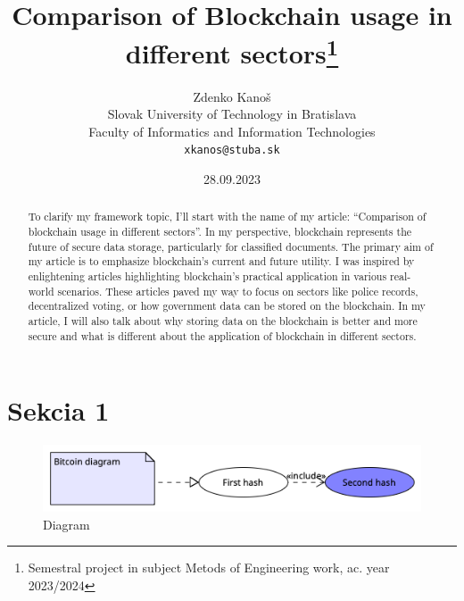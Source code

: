 \documentclass[10pt,twocolumn,twoside,slovak,a4paper]{article}
\title{Comparison of Blockchain usage in different sectors\thanks{Semestral project in subject Metods of Engineering work, ac. year 2023/2024}} %
\author{Zdenko Kanoš\\[2pt]
	{\small Slovak University of Technology in Bratislava}\\
	{\small Faculty of Informatics and Information Technologies}\\
	{\small \texttt{xkanos@stuba.sk}}
	}
\date{\small 28.09.2023} %
\begin{document}
\maketitle

\begin{abstract}
To clarify my framework topic, I'll start with the name of my article: “Comparison of
blockchain usage in different sectors”. In my perspective, blockchain represents the future
of secure data storage, particularly for classified documents. The primary aim of my article is
to emphasize blockchain’s current and future utility. I was inspired by enlightening articles
highlighting blockchain's practical application in various real-world scenarios. These articles
paved my way to focus on sectors like police records, decentralized voting, or how
government data can be stored on the blockchain. In my article, I will also talk about why
storing data on the blockchain is better and more secure and what is different about the
application of blockchain in different sectors.
\end{abstract}

\section{Sekcia 1}
 \begin{figure}
  \centering
  \includegraphics[]{Diagram 2023-10-19 12-37-46.png}
  \caption{Diagram}
 \end{figure}







\end{document}
